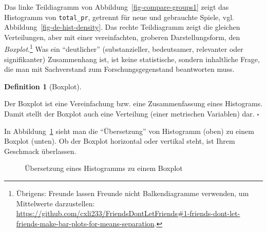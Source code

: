 \documentclass[
  letterpaper,
  twoside,
  open=any]{scrbook}
\theoremstyle{definition}
\newtheorem{definition}{Definition}[chapter]
\theoremstyle{definition}
\theoremstyle{definition}
\theoremstyle{remark}
\begin{document}
Das linke Teildiagramm von Abbildung~\ref{fig-compare-groups1} zeigt das
Histogramm von \texttt{total\_pr}, getrennt für neue und gebrauchte
Spiele, vgl. Abbildung~\ref{fig-de-hist-density}. Das rechte
Teildiagramm zeigt die gleichen Verteilungen, aber mit einer
vereinfachten, groberen Darstellungsform, den \emph{Boxplot}.\footnote{Übrigens:
  Freunde lassen Freunde nicht Balkendiagramme verwenden, um Mittelwerte
  darzustellen:
  \url{https://github.com/cxli233/FriendsDontLetFriends\#1-friends-dont-let-friends-make-bar-plots-for-means-separation}.}
Was ein \enquote{deutlicher} (substanzieller, bedeutsamer, relevanter
oder signifikanter) Zusammenhang ist, ist keine statistische, sondern
inhaltliche Frage, die man mit Sachverstand zum Forschungsgegenstand
beantworten muss.

\begin{definition}[Boxplot]\protect\hypertarget{def-boxplot}{}\label{def-boxplot}

Der Boxplot ist eine Vereinfachung bzw. eine Zusammenfassung eines
Histograms. Damit stellt der Boxplot auch eine Verteilung (einer
metrischen Variablen) dar. \(\square\)

\end{definition}

In Abbildung~\ref{fig-hist-to-box} sieht man die \enquote{Übersetzung}
von Histogramm (oben) zu einem Boxplot (unten). Ob der Boxplot
horizontal oder vertikal steht, ist Ihrem Geschmack überlassen.

\begin{figure}


\caption{\label{fig-hist-to-box}Übersetzung eines Histogramms zu einem
Boxplot}

\end{figure}%
\end{document}
